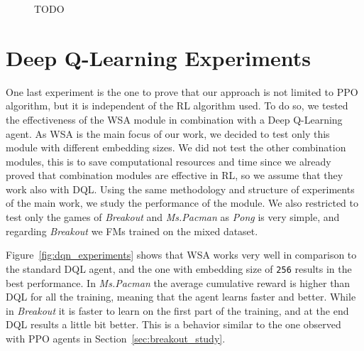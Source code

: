 \begin{figure}[ht]
\begin{subfigure}[b]{0.45\textwidth}
        \label{fig:breakout_weights2}
    \end{subfigure}

    \caption{TODO}
    \label{fig:breakout_attention}
\end{figure}








\section{Deep Q-Learning Experiments}\label{sec:dqn}

One last experiment is the one to prove that our approach is not limited to PPO algorithm, but it is independent of the RL algorithm used.
To do so, we tested the effectiveness of the WSA module in combination with a Deep Q-Learning agent.
As WSA is the main focus of our work, we decided to test only this module with different embedding sizes.
We did not test the other combination modules, this is to save computational resources and time since we already proved that combination modules are effective in RL, so we assume that they work also with DQL\@.
Using the same methodology and structure of experiments of the main work, we study the performance of the module.
We also restricted to test only the games of \textit{Breakout} and \textit{Ms.Pacman} as \textit{Pong} is very simple, and regarding \textit{Breakout} we FMs trained on the mixed dataset.

Figure~\ref{fig:dqn_experiments} shows that WSA works very well in comparison to the standard DQL agent, and the one with embedding size of \texttt{256} results in the best performance.
In \textit{Ms.Pacman} the average cumulative reward is higher than DQL for all the training, meaning that the agent learns faster and better.
While in \textit{Breakout} it is faster to learn on the first part of the training, and at the end DQL results a little bit better.
This is a behavior similar to the one observed with PPO agents in Section~\ref{sec:breakout_study}.


